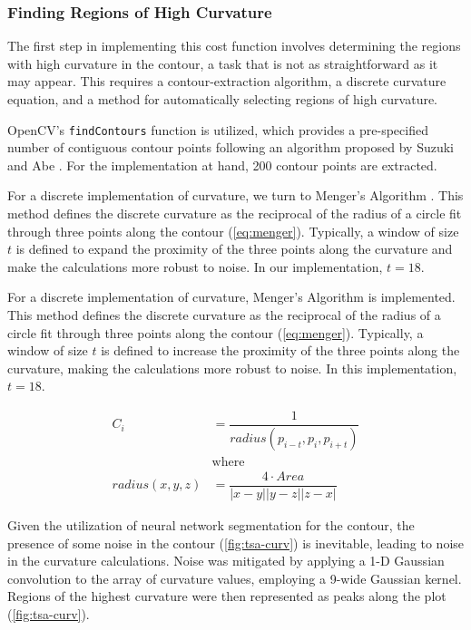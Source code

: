 \subsubsection{Finding Regions of High Curvature}
The first step in implementing this cost function involves determining the regions with high curvature in the contour, a task that is not as straightforward as it may appear.
This requires a contour-extraction algorithm, a discrete curvature equation, and a method for automatically selecting regions of high curvature.

OpenCV's \texttt{findContours} function \cite{bradskiOpenCVLibrary2000} is utilized, which provides a pre-specified number of contiguous contour points following an algorithm proposed by Suzuki and Abe \cite{suzukiTopologicalStructuralAnalysis1985}.
For the implementation at hand, 200 contour points are extracted.


For a discrete implementation of curvature, we turn to Menger's Algorithm \cite{legerMengerCurvatureRectifiability1999}.
This method defines the discrete curvature as the reciprocal of the radius of a circle fit through three points along the contour (\cref{eq:menger}).
Typically, a window of size $t$ is defined to expand the proximity of the three points along the curvature and make the calculations more robust to noise. In our implementation, $t=18$.

For a discrete implementation of curvature, Menger's Algorithm \cite{legerMengerCurvatureRectifiability1999} is implemented.
This method defines the discrete curvature as the reciprocal of the radius of a circle fit through three points along the contour (\cref{eq:menger}).
Typically, a window of size $t$ is defined to increase the proximity of the three points along the curvature, making the calculations more robust to noise.
In this implementation, $t=18$.


\begin{equation}
  \label{eq:menger}
  \begin{split}
  C_{i} &= \dfrac{1}{radius(p_{i-t},p_{i},p_{i+t})}\\
        &\text{where} \\
        radius(x,y,z) &= \dfrac{4 \cdot Area}{|x-y||y-z||z-x|}
  \end{split}
\end{equation}

Given the utilization of neural network segmentation for the contour, the presence of some noise in the contour (\cref{fig:tsa-curv}) is inevitable, leading to noise in the curvature calculations.
Noise was mitigated by applying a 1-D Gaussian convolution to the array of curvature values, employing a 9-wide Gaussian kernel.
Regions of the highest curvature were then represented as peaks along the plot (\cref{fig:tsa-curv}).

